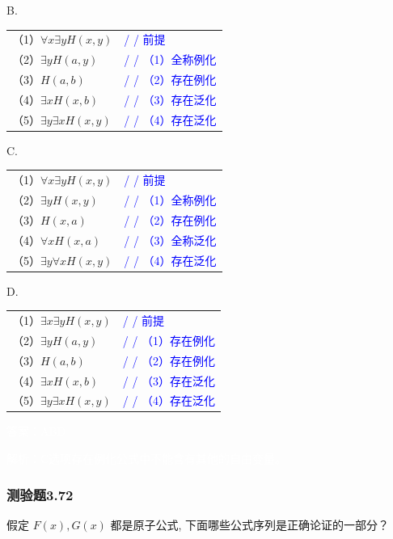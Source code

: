 \documentclass[UTF8, heading=true]{ctexart}
\begin{document}
B.

\begin{tabular}{ll}
  （1）$\forall x \exists y H(x, y)$ & \textcolor{blue}{/ / 前提} \\
  （2）$\exists y H(a, y)$ & \textcolor{blue}{/ / （1）全称例化} \\
  （3）$H(a, b)$ & \textcolor{blue}{/ / （2）存在例化} \\
  （4）$\exists x H(x, b)$ & \textcolor{blue}{/ / （3）存在泛化} \\
  （5）$\exists y \exists x H(x, y)$ & \textcolor{blue}{/ / （4）存在泛化}
\end{tabular}


C.

\begin{tabular}{ll}
  （1）$\forall x \exists y H(x, y)$ & \textcolor{blue}{/ / 前提} \\
  （2）$\exists y H(x, y)$ & \textcolor{blue}{/ / （1）全称例化} \\
  （3）$H(x, a)$ & \textcolor{blue}{/ / （2）存在例化} \\
  （4）$\forall x H(x, a)$ & \textcolor{blue}{/ / （3）全称泛化} \\
  （5）$\exists y \forall x H(x, y)$ & \textcolor{blue}{/ / （4）存在泛化}
\end{tabular}

D.

\begin{tabular}{ll}
  （1）$\exists x \exists y H(x, y)$ & \textcolor{blue}{/ / 前提} \\
  （2）$\exists y H(a, y)$ & \textcolor{blue}{/ / （1）存在例化} \\
  （3）$H(a, b)$ & \textcolor{blue}{/ / （2）存在例化} \\
  （4）$\exists x H(x, b)$ & \textcolor{blue}{/ / （3）存在泛化} \\
  （5）$\exists y \exists x H(x, y)$ & \textcolor{blue}{/ / （4）存在泛化}
\end{tabular}

\textcolor{white}{答案：ABD}

\textcolor{white}{解析：C选项存在例化公式中不能含有其他的自由变量。}

\subsubsection{测验题3.72}

假定 $F(x),G(x)$ 都是原子公式, 下面哪些公式序列是正确论证的一部分？
\end{document}
